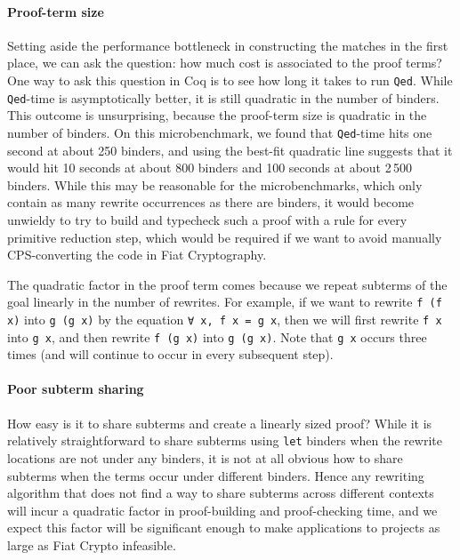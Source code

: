 \paragraph{Proof-term size}

Setting aside the performance bottleneck in constructing the matches in the first place, we can ask the question: how much cost is associated to the proof terms?
One way to ask this question in Coq is to see how long it takes to run \texttt{Qed}.
While \texttt{Qed}-time is asymptotically better, it is still quadratic in the number of binders.
This outcome is unsurprising, because the proof-term size is quadratic in the number of binders.
On this microbenchmark, we found that \texttt{Qed}-time hits one second at about 250 binders, and using the best-fit quadratic line suggests that it would hit 10 seconds at about 800 binders and 100 seconds at about 2\,500 binders.
While this may be reasonable for the microbenchmarks, which only contain as many rewrite occurrences as there are binders, it would become unwieldy to try to build and typecheck such a proof with a rule for every primitive reduction step, which would be required if we want to avoid manually CPS-converting the code in Fiat Cryptography.

The quadratic factor in the proof term comes because we repeat subterms of the goal linearly in the number of rewrites.
For example, if we want to rewrite \texttt{f (f x)} into \texttt{g (g x)} by the equation \texttt{∀ x, f x = g x}, then we will first rewrite \texttt{f x} into \texttt{g x}, and then rewrite \texttt{f (g x)} into \texttt{g (g x)}.
Note that \texttt{g x} occurs three times (and will continue to occur in every subsequent step).

\paragraph{Poor subterm sharing}

How easy is it to share subterms and create a linearly sized proof?
While it is relatively straightforward to share subterms using \texttt{let} binders when the rewrite locations are not under any binders, it is not at all obvious how to share subterms when the terms occur under different binders.
Hence any rewriting algorithm that does not find a way to share subterms across different contexts will incur a quadratic factor in proof-building and proof-checking time, and we expect this factor will be significant enough to make applications to projects as large as Fiat Crypto infeasible.

